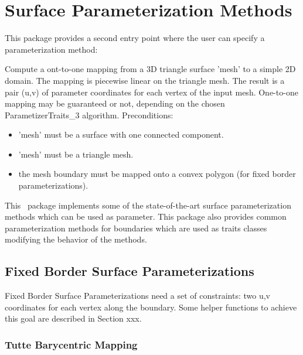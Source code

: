 \section{Surface Parameterization Methods}


This package provides a second  entry point
where the user can specify a parameterization method:

{ Compute a ont-to-one mapping from a 3D triangle surface 'mesh' to a
simple 2D domain. The mapping is piecewise linear on the triangle
mesh. The result is a pair (u,v) of parameter coordinates for each
vertex of the input mesh.  One-to-one mapping may be guaranteed or
not, depending on the chosen ParametizerTraits\_3 algorithm.
Preconditions:\begin{itemize} 
\item 'mesh' must be a surface with one connected component.\item
'mesh' must be a triangle mesh.\item the mesh boundary must be mapped
onto a convex polygon (for fixed border
parameterizations).\end{itemize} }


This \cgal\ package implements some of the state-of-the-art surface
parameterization methods which can be used as
 parameter. This package also provides common parameterization methods for
boundaries which are used as traits classes modifying the behavior of
the  methods.


\subsection{Fixed Border Surface Parameterizations}


Fixed Border Surface Parameterizations need a set of constraints: two
u,v coordinates for each vertex along the boundary. Some helper
functions to achieve this goal are described in Section xxx.


\subsubsection{Tutte Barycentric Mapping}


